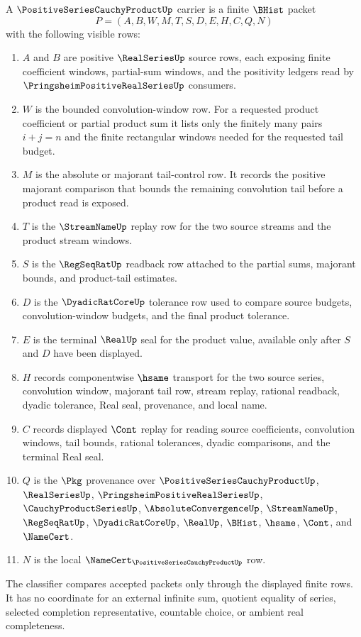 \begin{definition}
\label{def:positive-series-cauchy-product-carrier}
A $\PositiveSeriesCauchyProductUp$ carrier is a finite $\BHist$ packet
$$
P=(A,B,W,M,T,S,D,E,H,C,Q,N)
$$
with the following visible rows:
\begin{enumerate}
\item $A$ and $B$ are positive $\RealSeriesUp$ source rows, each exposing finite coefficient windows, partial-sum windows, and the positivity ledgers read by $\PringsheimPositiveRealSeriesUp$ consumers.
\item $W$ is the bounded convolution-window row. For a requested product coefficient or partial product sum it lists only the finitely many pairs $i+j=n$ and the finite rectangular windows needed for the requested tail budget.
\item $M$ is the absolute or majorant tail-control row. It records the positive majorant comparison that bounds the remaining convolution tail before a product read is exposed.
\item $T$ is the $\StreamNameUp$ replay row for the two source streams and the product stream windows.
\item $S$ is the $\RegSeqRatUp$ readback row attached to the partial sums, majorant bounds, and product-tail estimates.
\item $D$ is the $\DyadicRatCoreUp$ tolerance row used to compare source budgets, convolution-window budgets, and the final product tolerance.
\item $E$ is the terminal $\RealUp$ seal for the product value, available only after $S$ and $D$ have been displayed.
\item $H$ records componentwise $\hsame$ transport for the two source series, convolution window, majorant tail row, stream replay, rational readback, dyadic tolerance, Real seal, provenance, and local name.
\item $C$ records displayed $\Cont$ replay for reading source coefficients, convolution windows, tail bounds, rational tolerances, dyadic comparisons, and the terminal Real seal.
\item $Q$ is the $\Pkg$ provenance over $\PositiveSeriesCauchyProductUp$, $\RealSeriesUp$, $\PringsheimPositiveRealSeriesUp$, $\CauchyProductSeriesUp$, $\AbsoluteConvergenceUp$, $\StreamNameUp$, $\RegSeqRatUp$, $\DyadicRatCoreUp$, $\RealUp$, $\BHist$, $\hsame$, $\Cont$, and $\NameCert$.
\item $N$ is the local $\NameCert_{\PositiveSeriesCauchyProductUp}$ row.
\end{enumerate}
The classifier compares accepted packets only through the displayed finite rows. It has no coordinate for an external infinite sum, quotient equality of series, selected completion representative, countable choice, or ambient real completeness.
\end{definition}

